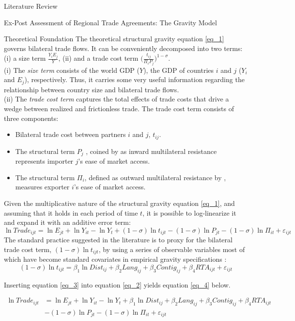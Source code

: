 \begin{section}{Literature Review}
\begin{subsection}{Ex-Post Assessment of Regional Trade Agreements: The Gravity Model}
\begin{subsubsection}{Theoretical Foundation}
The theoretical structural gravity equation \ref{eq_1} governs bilateral trade flows. It can be conveniently decomposed into two terms: (i) a size term $\frac{Y_{i}E_{j}}{Y}$, (ii) and a trade cost term $\Big(\frac{t_{ij}}{\Pi_{i}P_{j}}\Big)^{1-\sigma}$.
\bigskip
\\
(i) The \textit{size term} consists of the world GDP ($Y$), the GDP of countries $i$ and $j$ ($Y_{i}$ and $E_{j}$), respectively. Thus, it carries some very useful information regarding the relationship between country size and bilateral trade flows.
\bigskip
\\
(ii) The \textit{trade cost term} captures the total effects of trade costs that drive a wedge between realized and frictionless trade. The trade cost term consists of three components:
\begin{itemize}
\item Bilateral trade cost between partners $i$ and $j$, $t_{ij}$.
\item The structural term $P_{j}$ , coined by \cite{avw2003} as inward multilateral resistance represents importer $j$’s ease of market access.
\item The structural term $\Pi_{i}$, defined as outward multilateral resistance by \cite{avw2003}, measures exporter $i$’s ease of market access.
\end{itemize}

Given the multiplicative nature of the structural gravity equation \ref{eq_1}, and assuming that it holds in each period of time $t$, it is possible to log-linearize it and expand it with an additive error term:
\begin{equation}\label{eq_2}
   \ln{Trade_{ijt}}=\ln{E_{jt}}+ \ln{Y_{it}}-\ln{Y_{t}}+(1-\sigma)\ln{t_{ijt}}-(1-\sigma)\ln{P_{jt}}-(1-\sigma)\ln{\Pi_{it}}+\varepsilon_{ijt}
\end{equation}
The standard practice suggested in the literature is to proxy for the
bilateral trade cost term, $(1-\sigma)\ln{t_{ijt}}$, by using a series of observable variables most of which have become standard covariates in empirical gravity specifications \cite{ypl_2016}:
\begin{equation}\label{eq_3}
(1-\sigma)\ln{t_{ijt}}=\beta_{1}\ln{Dist_{ij}} + \beta_2 Lang_{ij} + \beta_3 Contig_{ij} + \beta_4RTA_{ijt}+\varepsilon_{ijt}
\end{equation}

Inserting equation \ref{eq_3} into equation \ref{eq_2} yields equation \ref{eq_4} below. 

\begin{equation}\label{eq_4}
\begin{aligned}
   \ln{Trade_{ijt}} &=\ln{E_{jt}}+ \ln{Y_{it}}-\ln{Y_{t}}+\beta_{1}\ln{Dist_{ij}} + \beta_2 Lang_{ij} + \beta_3 Contig_{ij} + \beta_4RTA_{ijt}\\
   &-(1-\sigma)\ln{P_{jt}}-(1-\sigma)\ln{\Pi_{it}}+\varepsilon_{ijt}
\end{aligned}
\end{equation}


\end{subsubsection}
\end{subsection}
\end{section}
